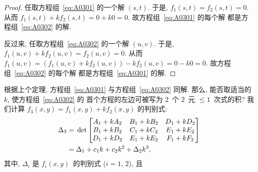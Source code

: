 \documentclass[../libro.tex]{subfiles}
\begin{document}
\begin{proof}
    任取方程组~\eqref{eq:A0301} 的一个解 \((s, t)\).
    于是, \(f_1 (s, t) = f_2 (s, t) = 0\).
    从而 \(f_1 (s, t) + kf_2 (s, t) = 0 + k0 = 0\).
    故方程组~\eqref{eq:A0301} 的每个解%
    都是方程组~\eqref{eq:A0302} 的解.

    反过来, 任取方程组~\eqref{eq:A0302} 的一个解 \((u, v)\).
    于是,
    \(f_1 (u, v) + k f_2 (u, v) = f_2 (u, v) = 0\).
    从而 \(f_1 (u, v)
        = (f_1 (u, v) + k f_2 (u, v)) - kf_2 (u, v)
    = 0 - k0 = 0\).
    故方程组~\eqref{eq:A0302} 的每个解%
    都是方程组~\eqref{eq:A0301} 的解.
\end{proof}

根据上个定理,
方程组~\eqref{eq:A0301} 与方程组~\eqref{eq:A0302}
同解.
那么, 能否取适当的 \(k\),
使方程组~\eqref{eq:A0302} 的%
首个方程的左边可被写为%
\(2\)~个 \(2\)~元 \({\leq} 1\)~次式的积?
我们计算 \(f_3 (x, y) = f_1 (x, y) + kf_2 (x, y)\)
的判别式:
\begin{align*}
    \Delta_3
    = {} &  \det
    \begin{bmatrix}
        A_1 + kA_2 & B_1 + kB_2 & D_1 + kD_2 \\
        B_1 + kB_2 & C_1 + kC_2 & E_1 + kE_2 \\
        D_1 + kD_2 & E_1 + kE_2 & F_1 + kF_2 \\
    \end{bmatrix}  \\
    = {} & \Delta_1 + c_1 k + c_2 k^2 + \Delta_2 k^3,
\end{align*}
其中, \(\Delta_i\) 是 \(f_i (x, y)\)~的判别式
(\(i = 1\), \(2\)), 且
\end{document}
